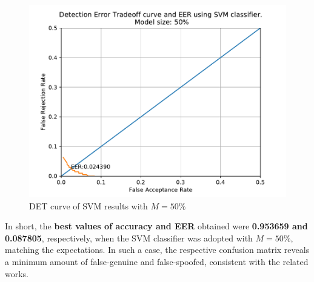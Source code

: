 	\begin{figure}[H]
		\centering
		\includegraphics[scale=.8]{images/results/det/DET_for_classifier_SVM_50.pdf}
		\caption{DET curve of SVM results with $M=50\%$}
		\label{fig:detsvm50}
	\end{figure}

	\par In short, the \textbf{best values of accuracy and EER} obtained were \textbf{0.953659 and 0.087805}, respectively, when the SVM classifier was adopted with $M=50\%$, matching the expectations. In such a case, the respective confusion matrix reveals a minimum amount of false-genuine and false-spoofed, consistent with the related works.
	
